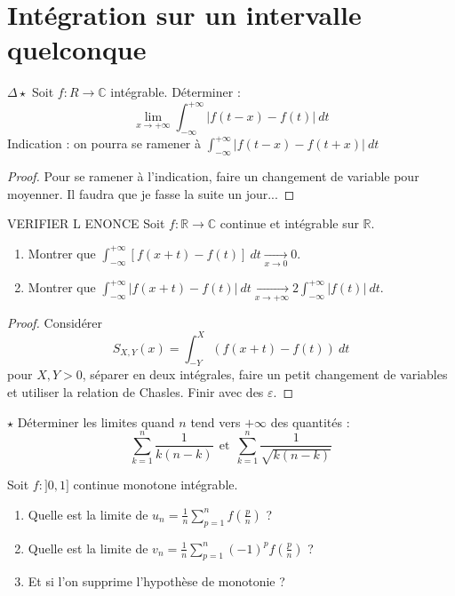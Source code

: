 \documentclass[french,a4paper]{article}
\newcommand{\R}{\mathbb{R}}
\newcommand{\C}{\mathbb{C}}
\theoremstyle{plain}
\theoremstyle{definition}
\theoremstyle{remark}
\begin{document}
\section{Intégration sur un intervalle quelconque}

\begin{ex}[Moulin.IG.36]{$\Delta\star$}
	Soit $f:R\to\C$ intégrable. Déterminer : $$\lim_{x\to+\infty}\int_{-\infty}^{+\infty}\lvert f(t-x)-f(t)\rvert\ dt$$ Indication : on pourra se ramener à $\displaystyle\int_{-\infty}^{+\infty}\lvert f(t-x)-f(t+x)\rvert\ dt$
\end{ex}
\begin{proof}
	Pour se ramener à l'indication, faire un changement de variable pour moyenner. Il faudra que je fasse la suite un jour...
\end{proof}

\begin{ex}[Châteaux]{VERIFIER L ENONCE}
	Soit $f:\R\to\C$ continue et intégrable sur $\R$.
	\begin{enumerate}
		\item Montrer que $\displaystyle\int_{-\infty}^{+\infty}\left[f(x+t)-f(t)\right]\ dt\xrightarrow[x\to0]{}0$.
		\item Montrer que $\displaystyle\int_{-\infty}^{+\infty}\left\lvert f(x+t)-f(t)\right\rvert\ dt\xrightarrow[x\to+\infty]{}2\int_{-\infty}^{+\infty}\lvert f(t)\rvert\ dt$.
	\end{enumerate}
\end{ex}
\begin{proof}
	Considérer $$S_{X,Y}(x)=\int_{-Y}^{X}(f(x+t)-f(t))\ dt$$ pour $X,Y>0$, séparer en deux intégrales, faire un petit changement de variables et utiliser la relation de Chasles. Finir avec des $\varepsilon$.
\end{proof}

\begin{ex}[Moulin.IG.37]{$\star$}
	Déterminer les limites quand $n$ tend vers $+\infty$ des quantités : $$\sum_{k=1}^{n}\frac{1}{k(n-k)}\ \ \text{et}\ \ \sum_{k=1}^{n}\frac{1}{\sqrt{k(n-k)}}$$
\end{ex}

\begin{ex}[Moulin.IG.38]{}
	Soit $f:]0,1]$ continue monotone intégrable.
	\begin{enumerate}
		\item Quelle est la limite de $u_n=\displaystyle\frac{1}{n}\sum_{p=1}^nf\left(\frac{p}{n}\right)$ ?
		\item Quelle est la limite de $v_n=\displaystyle\frac{1}{n}\sum_{p=1}^{n}(-1)^pf\left(\frac{p}{n}\right)$ ?
		\item Et si l'on supprime l'hypothèse de monotonie ?
	\end{enumerate}
\end{ex}
\end{document}
